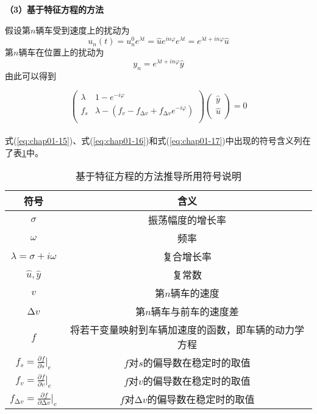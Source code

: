 \noindent \textbf{（3）基于特征方程的方法}

假设第$n$辆车受到速度上的扰动为
\begin{equation}
  u_n(t) = u_n^0e^{\lambda t} = \hat{u} e^{in\varphi} e^{\lambda t} = e^{\lambda t + in\varphi} \hat{u}
  \label{eq:chap01-15}
\end{equation}
第$n$辆车在位置上的扰动为
\begin{equation}
  y_n = e^{\lambda t + in\varphi}\hat{y}
  \label{eq:chap01-16}
\end{equation}
由此可以得到

\begin{equation}
  \left(\begin{array}{cc}
    \lambda & 1-e^{-i\varphi} \\
    f_s & \lambda - (f_v-f_{\increment{v}}+f_{\increment{v}} e^{-i\varphi}) \\
  \end{array} \right)
  \left(\begin{array}{cc}
    \hat{y} \\
    \hat{u} \\
  \end{array} \right) = 0
  \label{eq:chap01-17}
\end{equation}\\ 

\noindent 式(\ref{eq:chap01-15})、式(\ref{eq:chap01-16})和式(\ref{eq:chap01-17})中出现的符号含义列在了表\ref{tab:chap01-7}中。
\begin{table}
  \centering
  \caption{基于特征方程的方法推导所用符号说明}
  \begin{tabular}{cc}
    \toprule
    符号          &  含义                         \\
    \midrule
    $\sigma$          & 振荡幅度的增长率         \\
    $\omega$          & 频率         \\
    $\lambda=\sigma+i\omega$    & 复合增长率        \\
    $\hat{u}, \hat{y}$          & 复常数         \\
    $v$            & 第$n$辆车的速度         \\
    $\increment{v}$            & 第$n$辆车与前车的速度差         \\
    $f$            & 将若干变量映射到车辆加速度的函数，即车辆的动力学方程         \\
    $f_s = \frac{\partial f}{\partial s} |_e$          & $f$对$s$的偏导数在稳定时的取值         \\
    $f_v = \frac{\partial f}{\partial v} |_e$          & $f$对$v$的偏导数在稳定时的取值         \\
    $f_{\increment{v}} = \frac{\partial f}{\partial \increment{v}} |_e$          & $f$对$\increment{v}$的偏导数在稳定时的取值         \\
    \bottomrule
  \end{tabular}
  \label{tab:chap01-7}
\end{table}

